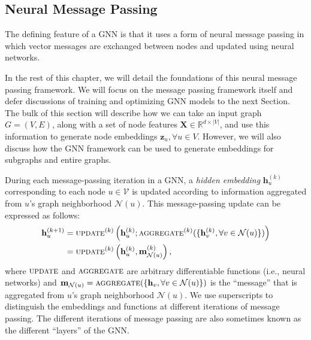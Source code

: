 \documentclass[10pt]{book}
\let\defaultmarginpar\marginpar
\renewcommand\marginpar[2][]{\defaultmarginpar{\itshape\color{gray}#2}}
\begin{document}
\subsection{Neural Message Passing}

The defining feature of a GNN is that it uses a form of neural message passing in which vector messages are exchanged between nodes and updated using neural networks.

In the rest of this chapter, we will detail the foundations of this neural message passing framework. We will focus on the message passing framework itself and defer discussions of training and optimizing GNN models to the next Section. The bulk of this section will describe how we can take an input graph $G = (V, E)$,
along with a set of node features $\mathbf X \in \mathbb R^{d \times |V|}$, and use this information to generate node embeddings $\mathbf z_u, \forall u \in V$. However, we will also discuss how the GNN framework can be used to generate embeddings for subgraphs and entire
graphs.

During each message-passing iteration in a GNN, a \emph{hidden embedding}\marginpar{hidden embedding} $\mathbf h^{(k)}_u$ corresponding to each node $u \in \mathcal V$ is updated according to information aggregated from $u$'s graph neighborhood $\mathcal N(u)$. This message-passing update can be expressed as follows:
\begin{align}
    \mathbf h^{(k+1)}_u &= \textsc{update}^{(k)} \left( \mathbf h^{(k)}_u; \textsc{aggregate}^{(k)}(\{\mathbf h^{(k)}_v, \forall v \in \mathcal N(u)\}) \right) 
    \label{eq:mess-pass} \\
    &= \textsc{update}^{(k)} \left( \mathbf h^{(k)}_u, \mathbf m^{(k)}_{\mathcal N(u)} \right),
    \label{eq:mess-pass2}
\end{align}
where $\textsc{update}$ and $\textsc{aggregate}$ are arbitrary differentiable functions (i.e., neural networks) and $\mathbf m_{\mathcal N(u)} = \textsc{aggregate}(\{\mathbf h_v, \forall v \in \mathcal N(u)\})$ is the ``message'' that is aggregated from $u$'s graph neighborhood $\mathcal N(u)$. We use superscripts to distinguish the embeddings and functions at different iterations of message passing. The different iterations of message passing are also sometimes known as the different ``layers'' of the GNN.
\end{document}
